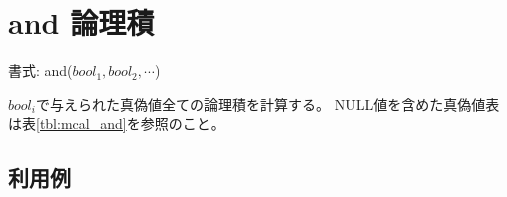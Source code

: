 
%

\section{and 論理積\label{sect:and}}

書式: and($bool_1,bool_2,\cdots$)

$bool_i$で与えられた真偽値全ての論理積を計算する。
NULL値を含めた真偽値表は表\ref{tbl:mcal_and}を参照のこと。

\subsection*{利用例}


%


